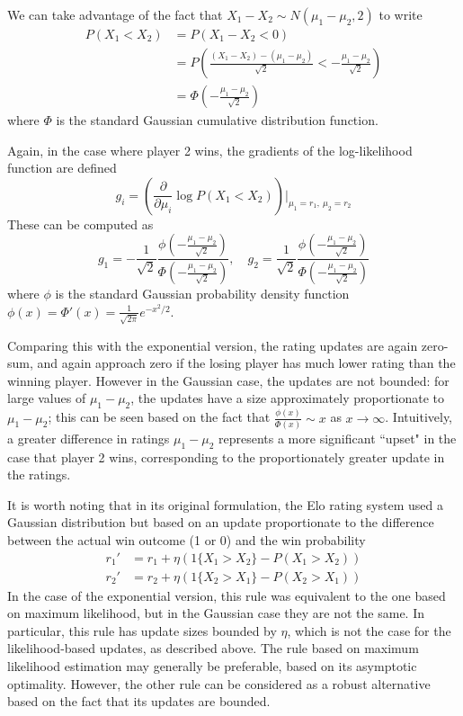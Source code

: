 \documentclass{article}
\begin{document}
	We can take advantage of the fact that $X_1 - X_2 \sim N(\mu_1 - \mu_2, 2)$ to write
	\begin{align*}
	P(X_1 < X_2) &= P(X_1 - X_2 < 0) \\
	&= P\left(\frac{(X_1 - X_2) - (\mu_1 - \mu_2)}{\sqrt 2} < -\frac{\mu_1 - \mu_2}{\sqrt 2}\right) \\
	&= \Phi\left(-\frac{\mu_1 - \mu_2}{\sqrt 2}\right)
	\end{align*}
	where $\Phi$ is the standard Gaussian cumulative distribution function.
	
	Again, in the case where player 2 wins, the gradients of the log-likelihood function are defined 
	$$g_i = \left(\frac{\partial}{\partial \mu_i} \log P(X_1 < X_2)\right) \bigg|_{\mu_1=r_1,\ \mu_2=r_2}$$
	These can be computed as
	$$
	g_1 = -\frac1{\sqrt 2}\frac{\phi\left(-\frac{\mu_1 - \mu_2}{\sqrt 2}\right)}{\Phi\left(-\frac{\mu_1 - \mu_2}{\sqrt 2}\right)},\quad
	g_2 = \frac1{\sqrt 2}\frac{\phi\left(-\frac{\mu_1 - \mu_2}{\sqrt 2}\right)}{\Phi\left(-\frac{\mu_1 - \mu_2}{\sqrt 2}\right)}
	$$
	where $\phi$ is the standard Gaussian probability density function $\phi(x) = \Phi'(x) = \frac1{\sqrt{2\pi}}e^{-x^2/2}$.

	Comparing this with the exponential version, the rating updates are again zero-sum, and again approach zero if the losing player
	has much lower rating than the winning player. However in the Gaussian case, the updates are not bounded: for large values of $\mu_1 - \mu_2$,
	the updates have a size approximately proportionate to $\mu_1 - \mu_2$; this can be seen based on the fact that
	$\frac{\phi(x)}{\Phi(x)} \sim x$ as $x \to \infty$. Intuitively, a greater difference in ratings $\mu_1 - \mu_2$ represents
	a more significant ``upset" in the case that player 2 wins, corresponding to the proportionately greater update in the ratings.
	
	It is worth noting that in its original formulation, the Elo rating system used a Gaussian distribution but based on an update
	proportionate to the difference between the actual win outcome (1 or 0) and the win probability
	\begin{align*}
	r_1' &= r_1 + \eta(1\{X_1 > X_2\} - P(X_1 > X_2)) \\
	r_2' &= r_2 + \eta(1\{X_2 > X_1\} - P(X_2 > X_1))
	\end{align*}
	In the case of the exponential version, this rule was equivalent to the one based on maximum likelihood, but in the Gaussian case
	they are not the same. In particular, this rule has update sizes bounded by $\eta$, which is not the case for the likelihood-based
	updates, as described above. The rule based on maximum likelihood estimation may generally be preferable, based on its asymptotic
	optimality. However, the other rule can be considered as a robust alternative based on the fact that its updates are bounded.
\end{document}

